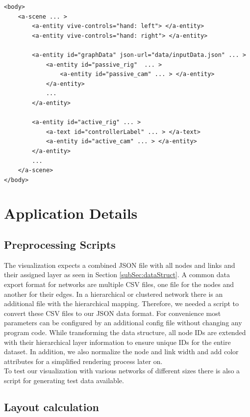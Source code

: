 \begin{lstlisting}[label={lst:virtualSceneGraph},caption=Simplified virtual A-Frame scene graph used by the application.]
<body>
    <a-scene ... >
        <a-entity vive-controls="hand: left"> </a-entity>
        <a-entity vive-controls="hand: right"> </a-entity>
        
        <a-entity id="graphData" json-url="data/inputData.json" ... >
            <a-entity id="passive_rig"  ... >  
                <a-entity id="passive_cam" ... > </a-entity>
            </a-entity>
            ...
        </a-entity>

        <a-entity id="active_rig" ... >
            <a-text id="controllerLabel" ... > </a-text>
            <a-entity id="active_cam" ... > </a-entity>
        </a-entity>
        ...
    </a-scene>
</body>
\end{lstlisting}

\section{Application Details}
\label{sec:applDetails}
\subsection{Preprocessing Scripts}
\label{sec:preprocessing}

The visualization expects a combined JSON file with all nodes and links and their assigned layer as seen in Section \ref{subSec:dataStruct}.
A common data export format for networks are multiple CSV files, one file for the nodes and another for their edges.
In a hierarchical or clustered network there is an additional file with the hierarchical mapping.
Therefore, we needed a script to convert these CSV files to our JSON data format. For convenience most parameters can be configured by an additional config file without changing any program code. 
While transforming the data structure, all node IDs are extended with their hierarchical layer information to ensure unique IDs for the entire dataset.  
In addition, we also normalize the node and link width and add color attributes for a simplified rendering process later on.\\
To test our visualization with various networks of different sizes there is also a script for generating test data available.

\subsection{Layout calculation}
\label{sec:layoutCalculation}

